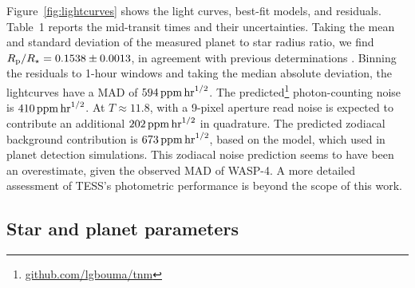 \documentclass[12pt,twocolumn,tighten]{aastex62}
\begin{document}
Figure~\ref{fig:lightcurves} shows the light curves, best-fit models,
and residuals.  Table~1 reports the mid-transit times and their
uncertainties.  Taking the mean and standard deviation of the measured
planet to star radius ratio, we find $R_{\rm
p}/R_\star=0.1538\pm0.0013$, in agreement with previous determinations
\citep{wilson_wasp-4b_2008,gillon_improved_2009,winn_transit_2009,southworth_high-precision_2009}.
Binning the residuals to 1-hour windows and taking the median absolute
deviation, the lightcurves have a MAD of $594\,{\rm ppm}\,{\rm
hr}^{1/2}$.  The predicted\footnote{\url{github.com/lgbouma/tnm}}
photon-counting noise is $410\,{\rm ppm}\,{\rm hr}^{1/2}$.  At
$T\approx11.8$, with a 9-pixel aperture read noise is expected to
contribute an additional $202\,{\rm ppm}\,{\rm hr}^{1/2}$ in
quadrature.  The predicted zodiacal background contribution is
$673\,{\rm ppm}\,{\rm hr}^{1/2}$, based on the
\citet{winn_photonflux_2013} model, which \citet{Sullivan_2015} used
in planet detection simulations.  This zodiacal noise prediction seems
to have been an overestimate, given the observed MAD of WASP-4.  A
more detailed assessment of TESS's photometric performance is beyond
the scope of this work.


\subsection{Star and planet parameters}
\label{sec:system_parameters}
\end{document}
